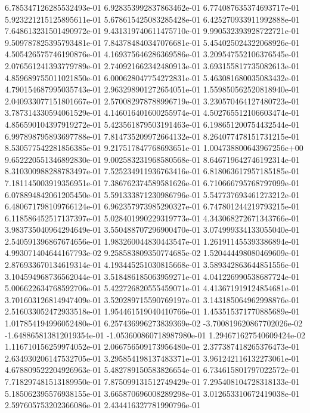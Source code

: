 6.785347126285532493e-01
6.928353992837863462e-01
6.774087635374693717e-01
5.923221215125895611e-01
5.678615425083285428e-01
6.425270933911992888e-01
7.648613231501490972e-01
9.431319740611475710e-01
9.990532393928722721e-01
9.509787825395793481e-01
7.843784840347076681e-01
5.454025024322068926e-01
4.505426575746190876e-01
4.169375646286369586e-01
3.209547552106376545e-01
2.076561241393779789e-01
2.740921662342480913e-01
3.693155817735082613e-01
4.859689755011021850e-01
6.000628047754272831e-01
5.463081680035083432e-01
4.790154687995035743e-01
2.963298901272654051e-01
1.559850562520818940e-01
2.040933077151801667e-01
2.570082978788996719e-01
3.230570464127480723e-01
3.787314330594061529e-01
4.146016401600255974e-01
4.502765512106603474e-01
4.856590104397919272e-01
5.423561879503191463e-01
6.198651200754432544e-01
6.997898795893697788e-01
7.814735209972664132e-01
8.264077478151731215e-01
8.530577542281856385e-01
9.217517847768693651e-01
1.004738800643967256e+00
9.652220551346892830e-01
9.002583231968580568e-01
8.646719642746192314e-01
8.310300988288783497e-01
7.525234911936763416e-01
6.818063617957185185e-01
7.181145003919356951e-01
7.386762374589581626e-01
6.710666795768797099e-01
6.078894842061205450e-01
5.591333871230986796e-01
5.547737693461273212e-01
6.480671798109766124e-01
6.962357973985290327e-01
6.747801244219793215e-01
6.118586452517137397e-01
5.028401990229319773e-01
4.343068272671343766e-01
3.983735040964294649e-01
3.550488707296900470e-01
3.074999334133055040e-01
2.540591396867674656e-01
1.983260044830443547e-01
1.261911455393386894e-01
4.993071404644167793e-02
9.258583809350774685e-02
1.520444498080469609e-01
2.876933670134619314e-01
4.193445251030815668e-01
3.589342863644851556e-01
3.104594968736562044e-01
3.518486185063959271e-01
4.041226990538687724e-01
5.006622634768592706e-01
5.422726820555459071e-01
4.413671919124854681e-01
3.701603126814947409e-01
3.520289715590769197e-01
3.143185064962998876e-01
2.516033052472933518e-01
1.954461519040410766e-01
1.453515371770885689e-01
1.017854194996052480e-01
6.257436996273839369e-02
-3.700819620867702026e-02
-1.648865813812019354e-01
-1.053600860718987980e-01
1.294671627540609424e-02
1.116710156259974052e-01
2.066756509173956480e-01
2.377387418265376473e-01
2.634930206147532705e-01
3.295854198137483371e-01
3.961242116132273061e-01
4.678809522204926963e-01
5.482789150583826654e-01
6.734615801797022572e-01
7.718297481513189950e-01
7.875099131512749429e-01
7.295408104728318133e-01
5.185062395576938155e-01
3.665870696008289298e-01
3.012653310672419038e-01
2.597605753202366086e-01
2.434416327781990796e-01
